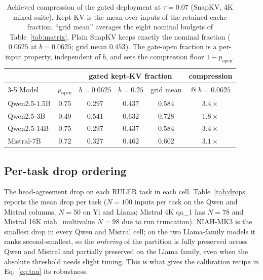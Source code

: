 \documentclass{article}
\begin{document}
\begin{table}[t]
\centering
\caption{Achieved compression of the gated deployment at $\tau=0.07$ (SnapKV,
4K mixed suite). Kept-KV is the mean over inputs of the retained cache
fraction; ``grid mean'' averages the eight nominal budgets of
Table~\ref{tab:matrix}. Plain SnapKV keeps exactly the nominal fraction
($0.0625$ at $b=0.0625$; grid mean $0.453$). The gate-open fraction is a
per-input property, independent of $b$, and sets the compression floor
$1-p_{\text{open}}$.}
\label{tab:achieved-compression}
\begin{tabular}{lccccc}
\toprule
 & & \multicolumn{3}{c}{gated kept-KV fraction} & compression \\
\cmidrule(lr){3-5}
Model & $p_{\text{open}}$ & $b{=}0.0625$ & $b{=}0.25$ & grid mean & @ $b{=}0.0625$ \\
\midrule
Qwen2.5-1.5B & $0.75$ & $0.297$ & $0.437$ & $0.584$ & $3.4\times$ \\
Qwen2.5-3B   & $0.49$ & $0.541$ & $0.632$ & $0.728$ & $1.8\times$ \\
Qwen2.5-14B  & $0.75$ & $0.297$ & $0.437$ & $0.584$ & $3.4\times$ \\
Mistral-7B   & $0.72$ & $0.327$ & $0.462$ & $0.602$ & $3.1\times$ \\
\bottomrule
\end{tabular}
\end{table}

\subsection{Per-task drop ordering}
\label{subsec:drops-ordering}

The head-agreement drop on each RULER task in each cell.
Table~\ref{tab:drops} reports the mean drop per task ($N = 100$ inputs
per task on the Qwen and Mistral columns, $N = 50$ on Yi and Llama;
Mistral 4K qa\_1 has $N = 78$ and Mistral 16K niah\_multivalue $N = 98$
due to run truncation). NIAH-MK3 is the smallest drop in every Qwen and
Mistral cell; on the two Llama-family models it ranks second-smallest,
so the \emph{ordering} of the partition is fully preserved across Qwen
and Mistral and partially preserved on the Llama family, even when the
absolute threshold needs slight tuning. This is
what gives the calibration recipe in Eq.~\eqref{eq:tau} its robustness.
\end{document}
